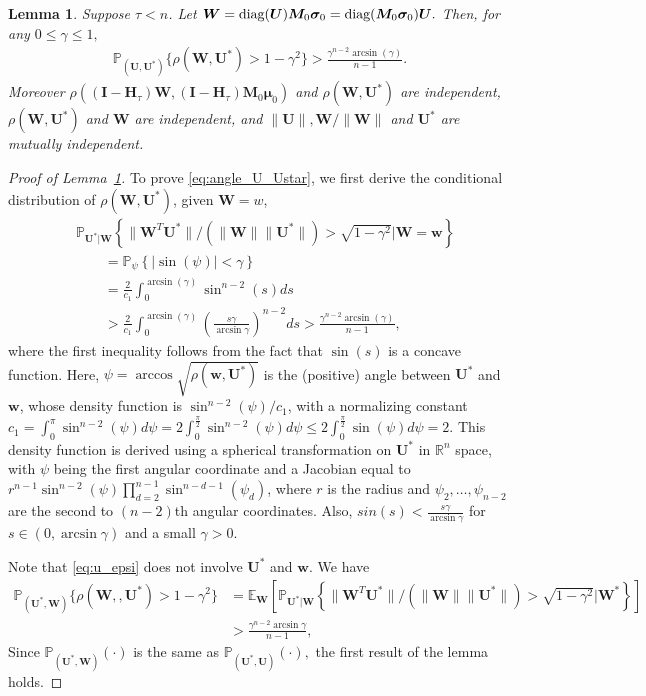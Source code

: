 \documentclass[12pt]{article}
\theoremstyle{shortspace}
\newtheorem{lemma}{Lemma}
\def\*#1{\bm{#1}}
\def\P{\mathbb P}
\def\E{\mathbb E}
\newcommand{\RR}{\mathbb{R}}
\newcommand{\diag}{\hbox{diag}}
\begin{document}
\begin{lemma}
\label{lem::angle}  Suppose $\tau < n$. Let $\*W= \diag(\*U)\*M_0 \*\sigma_0  = \diag(\*M_0 \*\sigma_0) \*U.$ Then, for any $0 \leq \gamma \leq 1,$ 
\begin{align}
\label{eq:angle_U_Ustar}
      \P_{(\*U, \*U^*)}\{\rho(\*W, \*U^*) > 1-\gamma^2\} > \frac{\gamma^{n-2}\arcsin (\gamma)}{n-1}. 
\end{align}
Moreover $\rho((\*I - \*H_\tau)\*W, (\*I - \*H_\tau)\*M_0\*\mu_0)$ and $\rho(\*W, \*U^*)$ are independent, $\rho(\*W, \*U^*)$ and $\*W$ are independent, and $\|\*U\|, \*W/\|\*W\|$ and $\*U^*$ are mutually independent. 
\end{lemma}


\begin{proof}[Proof of Lemma~\ref{lem::angle}]

 
To prove \eqref{eq:angle_U_Ustar}, we first derive the conditional distribution of $\rho(\*W, \*U^*)$,  given $\*W =w$,  
\begin{align}\label{eq:u_epsi}
    & \P_{\*U^*|\*W}\left\{{\|\*W^T \*U^*\|}\big/{(\|\*W\|\| \*U^*\|)} > \sqrt{1 - \gamma^2} \bigg|  \*W=\*w \right\}\nonumber\\
    & \qquad =  \P_{ \psi}\left\{  |\sin(\psi)|  < \gamma  \right\} \nonumber \\
    & \qquad = \frac{2}{c_1}\int_0^{\arcsin (\gamma)} \sin^{n-2}(s) ds  \nonumber \\
    & \qquad >  \frac{2}{c_1}\int_0^{\arcsin (\gamma)} (\frac{s \gamma }{\arcsin \gamma})^{n-2} ds>  \frac{\gamma^{n-2}\arcsin (\gamma)}{n-1},
\end{align}
where the first inequality follows from the fact that $\sin(s)$ is a concave function. Here,  $\psi = \arccos{\sqrt{ \rho(\*w, \*U^*)}}$ is the (positive) angle between $\*U^*$ and $\*w$, whose density function is $\sin^{n-2}(\psi)/c_1$, with a normalizing constant $c_1 = \int_0^{\pi} \sin^{n-2} (\psi) d\psi = 2 \int_0^{\frac \pi 2} \sin^{n-2} (\psi) d\psi \leq 2 \int_0^{\frac \pi 2} \sin(\psi) d\psi = 2 $. This density function is derived using a spherical transformation on $\*U^*$ in $\RR^n$ space, with $\psi$ being the first angular coordinate and a Jacobian equal to $r^{n-1} \sin^{n-2}(\psi) \prod_{ d=2}^{n-1} \sin^{n-d-1}(\psi_d)$, where $r$ is the radius and $\psi_2, \dots, \psi_{n-2}$ are the second to $(n-2)$th angular coordinates. 
Also, $sin(s) < \frac{s \gamma }{\arcsin \gamma}$ for $s \in (0, \arcsin \gamma)$ and a small $\gamma >0$. 


Note that \eqref{eq:u_epsi} does not involve $\*U^*$ and $\*w$. We have
\begin{align*}
    \P_{( \*U^*, \*W)}\big\{ \rho(\*W,, \*U^*) > 1- \gamma^2 \big\} & =  \E_{\*W}\left[   \P_{\*U^*|\*W}\left\{{\|\*W^T \*U^*\|}\big/{(\|\*W\|\| \*U^*\|)} > \sqrt{1 - \gamma^2} \bigg| \*W^*\right\}\right]
  \\ & > \frac{\gamma^{n-2}\arcsin \gamma}{n-1}, 
\end{align*} 
Since $\P_{( \*U^*, \*W)}(\cdot)$ is the same as $\P_{( \*U^*, \*U)}(\cdot),$
the first result of the lemma holds. 



\end{proof}
\end{document}
